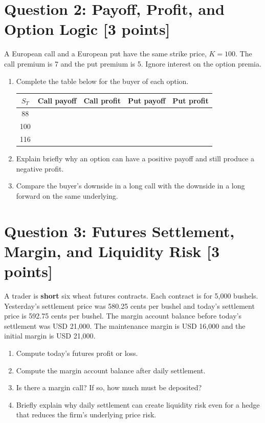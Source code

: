 \documentclass[11pt]{article}
\newcommand{\pts}[1]{\hspace{0.35em}\textnormal{\textbf{[#1 points]}}}
\newcommand{\St}{S_T}
\newcommand{\K}{K}
\begin{document}
\section*{Question 2: Payoff, Profit, and Option Logic \pts{3}}

A European call and a European put have the same strike price, $\K=100$. The call
premium is 7 and the put premium is 5. Ignore interest on the option premia.

\begin{enumerate}
    \item Complete the table below for the buyer of each option.

    \begin{center}
    \begin{tabular}{@{}ccccc@{}}
    \toprule
    $\St$ & Call payoff & Call profit & Put payoff & Put profit \\
    \midrule
    88  & & & & \\
    100 & & & & \\
    116 & & & & \\
    \bottomrule
    \end{tabular}
    \end{center}

    \item Explain briefly why an option can have a positive payoff and still
    produce a negative profit.
    \item Compare the buyer's downside in a long call with the downside in a long
    forward on the same underlying.
\end{enumerate}

\section*{Question 3: Futures Settlement, Margin, and Liquidity Risk \pts{3}}

A trader is \textbf{short} six wheat futures contracts. Each contract is for
5,000 bushels. Yesterday's settlement price was 580.25 cents per bushel and
today's settlement price is 592.75 cents per bushel. The margin account balance
before today's settlement was USD 21,000. The maintenance margin is USD 16,000
and the initial margin is USD 21,000.

\begin{enumerate}
    \item Compute today's futures profit or loss.
    \item Compute the margin account balance after daily settlement.
    \item Is there a margin call? If so, how much must be deposited?
    \item Briefly explain why daily settlement can create liquidity risk even
    for a hedge that reduces the firm's underlying price risk.
\end{enumerate}
\end{document}

